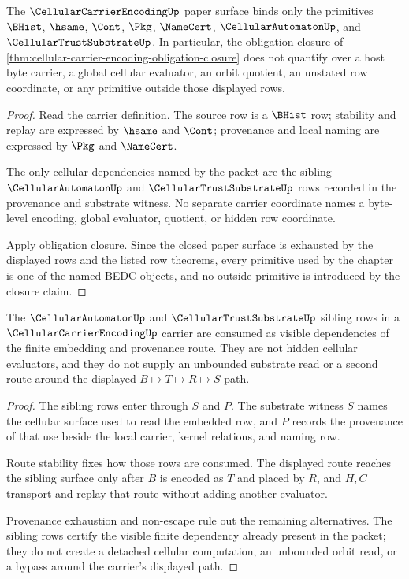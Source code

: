 \begin{theorem}\label{thm:cellular-carrier-encoding-primitive-scope-binding}
The $\CellularCarrierEncodingUp$ paper surface binds only the primitives $\BHist$, $\hsame$, $\Cont$, $\Pkg$, $\NameCert$, $\CellularAutomatonUp$, and $\CellularTrustSubstrateUp$. In particular, the obligation closure of \autoref{thm:cellular-carrier-encoding-obligation-closure} does not quantify over a host byte carrier, a global cellular evaluator, an orbit quotient, an unstated row coordinate, or any primitive outside those displayed rows.
\end{theorem}
\begin{proof}
Read the carrier definition. The source row is a $\BHist$ row; stability and replay are expressed by $\hsame$ and $\Cont$; provenance and local naming are expressed by $\Pkg$ and $\NameCert$.

The only cellular dependencies named by the packet are the sibling $\CellularAutomatonUp$ and $\CellularTrustSubstrateUp$ rows recorded in the provenance and substrate witness. No separate carrier coordinate names a byte-level encoding, global evaluator, quotient, or hidden row coordinate.

Apply obligation closure. Since the closed paper surface is exhausted by the displayed rows and the listed row theorems, every primitive used by the chapter is one of the named BEDC objects, and no outside primitive is introduced by the closure claim.
\end{proof}

\begin{theorem}\label{thm:cellular-carrier-encoding-sibling-scope-binding}
The $\CellularAutomatonUp$ and $\CellularTrustSubstrateUp$ sibling rows in a $\CellularCarrierEncodingUp$ carrier are consumed as visible dependencies of the finite embedding and provenance route. They are not hidden cellular evaluators, and they do not supply an unbounded substrate read or a second route around the displayed $B \longmapsto T \longmapsto R \longmapsto S$ path.
\end{theorem}
\begin{proof}
The sibling rows enter through $S$ and $P$. The substrate witness $S$ names the cellular surface used to read the embedded row, and $P$ records the provenance of that use beside the local carrier, kernel relations, and naming row.

Route stability fixes how those rows are consumed. The displayed route reaches the sibling surface only after $B$ is encoded as $T$ and placed by $R$, and $H,C$ transport and replay that route without adding another evaluator.

Provenance exhaustion and non-escape rule out the remaining alternatives. The sibling rows certify the visible finite dependency already present in the packet; they do not create a detached cellular computation, an unbounded orbit read, or a bypass around the carrier's displayed path.
\end{proof}

